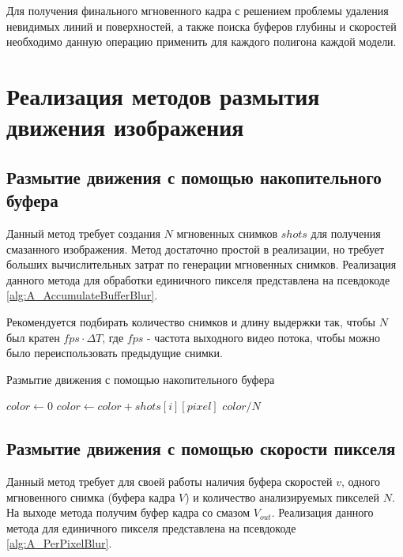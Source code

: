 Для получения финального мгновенного кадра с решением проблемы удаления невидимых линий и поверхностей, а также поиска буферов глубины и скоростей необходимо данную операцию применить для каждого полигона каждой модели.

\section{Реализация методов размытия движения изображения}

\subsection{Размытие движения с помощью накопительного буфера}

Данный метод требует создания $N$ мгновенных снимков $shots$ для получения смазанного изображения. Метод достаточно простой в реализации, но требует больших вычислительных затрат по генерации мгновенных снимков. Реализация данного метода для обработки единичного пикселя представлена на псевдокоде \ref{alg:A_AccumulateBufferBlur}.

Рекомендуется подбирать количество снимков и длину выдержки так, чтобы $N$ был кратен $fps \cdot \Delta T$, где $fps$ - частота выходного видео потока, чтобы можно было переиспользовать предыдущие снимки.

\begin{breakablealgorithm}
    \caption{Размытие движения с помощью накопительного буфера} \label{alg:A_AccumulateBufferBlur}
    \begin{algorithmic}[1]
        \State $color \leftarrow 0$
        \ForAll{$i \in [0; N)$}
            \State $color \leftarrow color + shots[i][pixel]$
        \EndFor
        \State \Return $color / N$
        \EndFunction
\end{algorithmic}
\end{breakablealgorithm}

\subsection{Размытие движения с помощью скорости пикселя}

Данный метод требует для своей работы наличия буфера скоростей $v$, одного мгновенного снимка (буфера кадра $V$) и количество анализируемых пикселей $N$.  На выходе метода получим буфер кадра со смазом $V_{out}$. Реализация данного метода для единичного пикселя представлена на псевдокоде \ref{alg:A_PerPixelBlur}.

